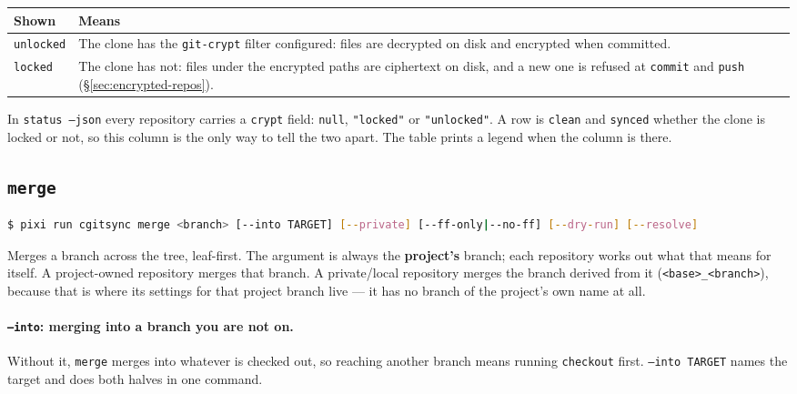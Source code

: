 \begin{center}
\begin{tabular}{lp{10cm}}
\textbf{Shown} & \textbf{Means} \\
\hline
\texttt{unlocked} & The clone has the \texttt{git-crypt} filter configured:
                    files are decrypted on disk and encrypted when
                    committed. \\
\texttt{locked}   & The clone has not: files under the encrypted paths are
                    ciphertext on disk, and a new one is refused at
                    \texttt{commit} and \texttt{push}
                    (\S\ref{sec:encrypted-repos}). \\
\end{tabular}
\end{center}

In \texttt{status --json} every repository carries a \texttt{crypt} field:
\texttt{null}, \texttt{"locked"} or \texttt{"unlocked"}. A row is
\texttt{clean} and \texttt{synced} whether the clone is locked or not, so
this column is the only way to tell the two apart. The table prints a legend
when the column is there.

\subsection{\texttt{merge}}

\begin{lstlisting}[language=bash]
$ pixi run cgitsync merge <branch> [--into TARGET] [--private] [--ff-only|--no-ff] [--dry-run] [--resolve]
\end{lstlisting}

Merges a branch across the tree, leaf-first. The argument is always the
\textbf{project's} branch; each repository works out what that means for
itself. A project-owned repository merges that branch. A private/local
repository merges the branch derived from it
(\texttt{<base>\_<branch>}), because that is where its settings for that
project branch live --- it has no branch of the project's own name at all.

\paragraph{\texttt{--into}: merging into a branch you are not on.} Without
it, \texttt{merge} merges into whatever is checked out, so reaching another
branch means running \texttt{checkout} first. \texttt{--into TARGET} names
the target and does both halves in one command.

